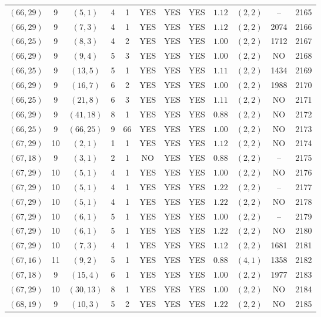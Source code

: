 \begin{longtable}{|c|c|c|c|c|c|c|c|c|c|c|c|}
$(66,29)$ & 9 & $(5,1)$ & 4 & 1 & YES & YES & YES & $1.12$ & $(2,2)$ & -- & 2165\\
$(66,29)$ & 9 & $(7,3)$ & 4 & 1 & YES & YES & YES & $1.12$ & $(2,2)$ & 2074 & 2166\\
$(66,25)$ & 9 & $(8,3)$ & 4 & 2 & YES & YES & YES & $1.00$ & $(2,2)$ & 1712 & 2167\\
$(66,29)$ & 9 & $(9,4)$ & 5 & 3 & YES & YES & YES & $1.00$ & $(2,2)$ & NO & 2168\\
$(66,25)$ & 9 & $(13,5)$ & 5 & 1 & YES & YES & YES & $1.11$ & $(2,2)$ & 1434 & 2169\\
$(66,29)$ & 9 & $(16,7)$ & 6 & 2 & YES & YES & YES & $1.00$ & $(2,2)$ & 1988 & 2170\\
$(66,25)$ & 9 & $(21,8)$ & 6 & 3 & YES & YES & YES & $1.11$ & $(2,2)$ & NO & 2171\\
$(66,29)$ & 9 & $(41,18)$ & 8 & 1 & YES & YES & YES & $0.88$ & $(2,2)$ & NO & 2172\\
$(66,25)$ & 9 & $(66,25)$ & 9 & 66 & YES & YES & YES & $1.00$ & $(2,2)$ & NO & 2173\\
$(67,29)$ & 10 & $(2,1)$ & 1 & 1 & YES & YES & YES & $1.12$ & $(2,2)$ & NO & 2174\\
$(67,18)$ & 9 & $(3,1)$ & 2 & 1 & NO & YES & YES & $0.88$ & $(2,2)$ & -- & 2175\\
$(67,29)$ & 10 & $(5,1)$ & 4 & 1 & YES & YES & YES & $1.00$ & $(2,2)$ & NO & 2176\\
$(67,29)$ & 10 & $(5,1)$ & 4 & 1 & YES & YES & YES & $1.22$ & $(2,2)$ & -- & 2177\\
$(67,29)$ & 10 & $(5,1)$ & 4 & 1 & YES & YES & YES & $1.22$ & $(2,2)$ & NO & 2178\\
$(67,29)$ & 10 & $(6,1)$ & 5 & 1 & YES & YES & YES & $1.00$ & $(2,2)$ & -- & 2179\\
$(67,29)$ & 10 & $(6,1)$ & 5 & 1 & YES & YES & YES & $1.22$ & $(2,2)$ & NO & 2180\\
$(67,29)$ & 10 & $(7,3)$ & 4 & 1 & YES & YES & YES & $1.12$ & $(2,2)$ & 1681 & 2181\\
$(67,16)$ & 11 & $(9,2)$ & 5 & 1 & YES & YES & YES & $0.88$ & $(4,1)$ & 1358 & 2182\\
$(67,18)$ & 9 & $(15,4)$ & 6 & 1 & YES & YES & YES & $1.00$ & $(2,2)$ & 1977 & 2183\\
$(67,29)$ & 10 & $(30,13)$ & 8 & 1 & YES & YES & YES & $1.00$ & $(2,2)$ & NO & 2184\\
$(68,19)$ & 9 & $(10,3)$ & 5 & 2 & YES & YES & YES & $1.22$ & $(2,2)$ & NO & 2185\\

\end{longtable}
